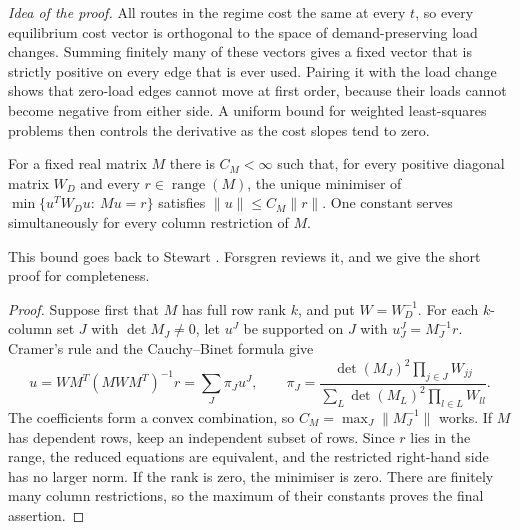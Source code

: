 \emph{Idea of the proof.} All routes in the regime cost the same at every $t$, so every equilibrium cost vector is orthogonal to the space of demand-preserving load changes. Summing finitely many of these vectors gives a fixed vector that is strictly positive on every edge that is ever used. Pairing it with the load change shows that zero-load edges cannot move at first order, because their loads cannot become negative from either side. A uniform bound for weighted least-squares problems then controls the derivative as the cost slopes tend to zero.

\begin{lemma}\label{fr:weighted}
For a fixed real matrix $M$ there is $C_M<\infty$ such that, for every positive diagonal matrix $W_D$ and every $r\in\operatorname{range}(M)$, the unique minimiser of $\min\{u^TW_Du:\ Mu=r\}$ satisfies $\|u\|\le C_M\|r\|$. One constant serves simultaneously for every column restriction of $M$.
\end{lemma}
This bound goes back to Stewart \cite{Stewart1989}. Forsgren \cite{Forsgren1996} reviews it, and we give the short proof for completeness.
\begin{proof}
Suppose first that $M$ has full row rank $k$, and put $W=W_D^{-1}$. For each $k$-column set $J$ with $\det M_J\ne0$, let $u^J$ be supported on $J$ with $u^J_J=M_J^{-1}r$. Cramer's rule and the Cauchy--Binet formula give
\begin{equation}\label{fr:basis_average}
 u=WM^T(MWM^T)^{-1}r=\sum_J\pi_Ju^J,
 \qquad
 \pi_J=\frac{\det(M_J)^2\prod_{j\in J}W_{jj}}{\sum_L\det(M_L)^2\prod_{l\in L}W_{ll}}.
\end{equation}
The coefficients form a convex combination, so $C_M=\max_J\|M_J^{-1}\|$ works. If $M$ has dependent rows, keep an independent subset of rows. Since $r$ lies in the range, the reduced equations are equivalent, and the restricted right-hand side has no larger norm. If the rank is zero, the minimiser is zero. There are finitely many column restrictions, so the maximum of their constants proves the final assertion.
\end{proof}

